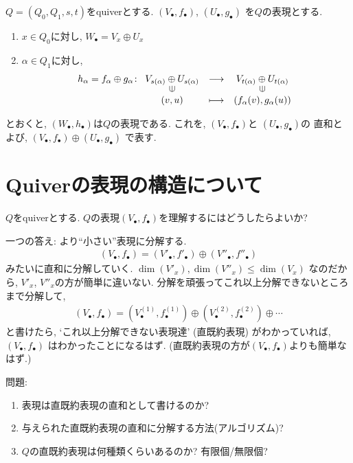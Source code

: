 \begin{example}
  $Q=(Q_0,Q_1,s,t)$をquiverとする.
  $(V_\bullet, f_\bullet)$,
  $(U_\bullet, g_\bullet)$
  を$Q$の表現とする.
  \begin{enumerate}
  \item
    $x\in Q_0$に対し,
    $W_\bullet=V_x\oplus U_x$
  \item
    $\alpha\in Q_1$に対し, 
    \begin{align*}
      h_\alpha = f_\alpha\oplus g_\alpha \colon
      \Shazo{V_{s(\alpha)}\oplus U_{s(\alpha)}}
      {V_{t(\alpha)}\oplus U_{t(\alpha)}}
      {(v,u)}{(f_\alpha(v),g_\alpha(u))}
    \end{align*}
  \end{enumerate}
    とおくと,
    $(W_\bullet,h_\bullet)$は$Q$の表現である.
    これを,
    $(V_\bullet, f_\bullet)$と
    $(U_\bullet, g_\bullet)$の
    直和とよび,
    $(V_\bullet, f_\bullet)\oplus (U_\bullet, g_\bullet)$
    で表す.
  \end{example}

\section{Quiverの表現の構造について}

$Q$をquiverとする.
$Q$の表現$(V_\bullet,f_\bullet)$を理解するにはどうしたらよいか?

一つの答え:
より``小さい''表現に分解する.
\begin{align*}
  (V_\bullet,f_\bullet)=
  (V'_\bullet,f'_\bullet)\oplus (V''_\bullet,f''_\bullet)
\end{align*}
みたいに直和に分解していく.
$\dim(V'_x),\dim(V''_x)\leq\dim(V_x)$
なのだから, $V'_x$, $V''_x$の方が簡単に違いない.
分解を頑張ってこれ以上分解できないところまで分解して,
\begin{align*}
(V_\bullet,f_\bullet)=
  (V^{(1)}_\bullet,f^{(1)}_\bullet)\oplus (V^{(2)}_\bullet,f^{(2)}_\bullet)
  \oplus \cdots
\end{align*}
と書けたら,
`これ以上分解できない表現達' (直既約表現)
がわかっていれば,
$(V_\bullet,f_\bullet)$
はわかったことになるはず.
(直既約表現の方が$(V_\bullet,f_\bullet)$よりも簡単なはず.)

問題:
\begin{enumerate}
\item
  \label{basicquestion:ks}
  表現は直既約表現の直和として書けるのか?
\item
  \label{basicquestion:ar}
  与えられた直既約表現の直和に分解する方法(アルゴリズム)?
\item
  \label{basicquestion:gt}
  $Q$の直既約表現は何種類くらいあるのか?
  有限個/無限個?
\end{enumerate}

